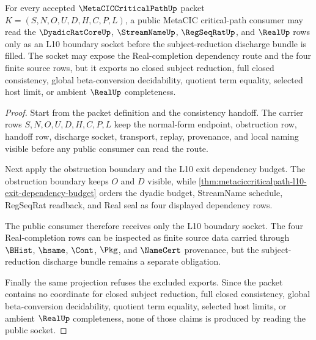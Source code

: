 \begin{theorem}
\label{thm:metacic-critical-path-real-completion-public-socket}
For every accepted $\MetaCICCriticalPathUp$ packet $K=(S,N,O,U,D,H,C,P,L)$, a public MetaCIC critical-path consumer may read the $\DyadicRatCoreUp$, $\StreamNameUp$, $\RegSeqRatUp$, and $\RealUp$ rows only as an L10 boundary socket before the subject-reduction discharge bundle is filled. The socket may expose the Real-completion dependency route and the four finite source rows, but it exports no closed subject reduction, full closed consistency, global beta-conversion decidability, quotient term equality, selected host limit, or ambient $\RealUp$ completeness.
\end{theorem}
\begin{proof}
Start from the packet definition and the consistency handoff. The carrier rows $S,N,O,U,D,H,C,P,L$ keep the normal-form endpoint, obstruction row, handoff row, discharge socket, transport, replay, provenance, and local naming visible before any public consumer can read the route.

Next apply the obstruction boundary and the L10 exit dependency budget. The obstruction boundary keeps $O$ and $D$ visible, while \autoref{thm:metaciccriticalpath-l10-exit-dependency-budget} orders the dyadic budget, StreamName schedule, RegSeqRat readback, and Real seal as four displayed dependency rows.

The public consumer therefore receives only the L10 boundary socket. The four Real-completion rows can be inspected as finite source data carried through $\BHist$, $\hsame$, $\Cont$, $\Pkg$, and $\NameCert$ provenance, but the subject-reduction discharge bundle remains a separate obligation.

Finally the same projection refuses the excluded exports. Since the packet contains no coordinate for closed subject reduction, full closed consistency, global beta-conversion decidability, quotient term equality, selected host limits, or ambient $\RealUp$ completeness, none of those claims is produced by reading the public socket.
\end{proof}

